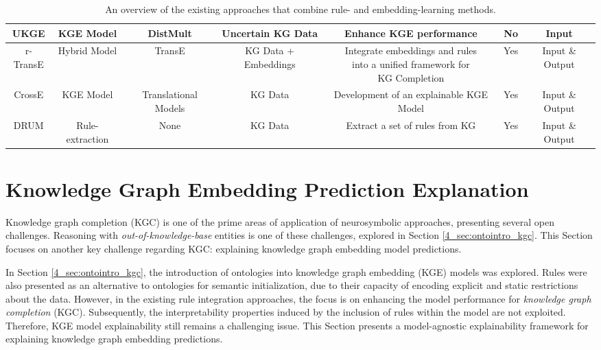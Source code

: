\begin{table}
{\begin{tabular}{|c|c|c|c|c|c|c|}
UKGE \citep{ukge}             & KGE Model       & DistMult                    & Uncertain KG Data           & Enhance KGE performance                                                               & No                             & Input                   \\ \hline
\makecell{r-TransE\\ \citep{rtranse}}         & Hybrid Model    & TransE                      & KG Data + Embeddings        & \makecell{Integrate embeddings and rules\\ into a unified framework for \\ KG Completion}             & Yes                            & Input \& Output                  \\ \hline
\makecell{CrossE\\ \citep{crosse}}        & KGE Model       & Translational Models        & KG Data                     & Development of an explainable KGE Model                                               & Yes                            & Input \& Output         \\ \hline
\makecell{DRUM\\ \citep{drum}}          & Rule-extraction & None                        & KG Data                     & Extract a set of rules from KG                                                        & Yes                            & Input \& Output  \\ \hline  
\end{tabular}  
 \caption{An overview of the existing approaches that combine rule- and embedding-learning methods.}
\label{tab:rules_kg}
}
\end{table}


\section{Knowledge Graph Embedding Prediction Explanation}\label{6_sec:geni_main}


Knowledge graph completion (KGC) is one of the prime areas of application of neurosymbolic approaches, presenting several open challenges. Reasoning with \textit{out-of-knowledge-base} entities is one of these challenges, explored in Section \ref{4_sec:ontointro_kgc}. This Section focuses on another key challenge regarding KGC: explaining knowledge graph embedding model predictions.

In Section \ref{4_sec:ontointro_kgc}, the introduction of ontologies into knowledge graph embedding (KGE) models was explored. Rules were also presented as an alternative to ontologies for semantic initialization, due to their capacity of encoding explicit and static restrictions about the data. However, in the existing rule integration approaches, the focus is on enhancing the model performance for \textit{knowledge graph completion} (KGC). Subsequently, the interpretability properties induced by the inclusion of rules within the model are not exploited. Therefore, KGE model explainability still remains a challenging issue. This Section presents a model-agnostic explainability framework for explaining knowledge graph embedding predictions.


